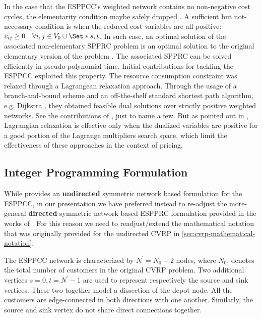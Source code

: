 In the case that the ESPPCC's weighted network contains no non-negative
cost cycles, the elementarity condition maybe safely dropped \parencite{beasley1989}.
A sufficient but not-necessary condition is when the reduced cost variables
are all positive: $\bar{c}_{ij} \ge 0 \quad \forall i, j \in V_0 \cup \Set*{s, t}$.
In such case, an optimal solution of the associated non-elementary SPPRC problem
is an optimal solution to the original elementary version of the problem \parencite{beasley1989}.
The associated SPPRC can be solved efficiently in pseudo-polynomial time.
Initial contributions for tackling the ESPPCC exploited this property.
The resource consumption constraint was relaxed through a Lagrangean relaxation
approach.
Through the usage of a branch-and-bound scheme and an off-the-shelf
standard shortest path algorithm, e.g. Dijkstra \parencite{sniedovich2006dijkstra},
they obtained feasible dual solutions over strictly positive weighted networks.
See the contributions of
\textcite{beasley1989, dumitrescu2003improved, carlyle2008, muhandiramge2009simultaneous},
just to name a few.
But as pointed out in \textcite{righini2004},
Lagrangian relaxation is effective only when the dualized variables
are positive for a good portion of the Lagrange multipliers search space,
which limit the effectiveness of these approaches in the context of pricing.

\subsection{Integer Programming Formulation}
\label{sec:espprc-integer-programming-formulation}

While \textcite{jepsen2008branchandcut} provides
an \textbf{undirected} symmetric network based formulation for the ESPPCC,
in our presentation we have preferred instead to re-adjust the more-general
\textbf{directed} symmetric network based ESPPRC formulation
provided in the works of \textcite{beasley1989, toth2002, toth2014}.
For this reason we need to readjust/extend the
mathematical notation that was originally provided for the undirected CVRP in \cref{sec:cvrp-mathematical-notation}.

\medskip

The ESPPCC network is characterized by $N^\prime = N_0 + 2$ nodes,
where $N_0$, denotes the total number of customers in the original CVRP problem.
Two additional vertices $s = 0, t = N^\prime - 1$ are used to represent respectively the source and sink vertices.
These two together model a dissection of the depot node.
All the customers are edge-connected in both directions with one another.
Similarly, the source and sink vertex do not share direct connections together.

